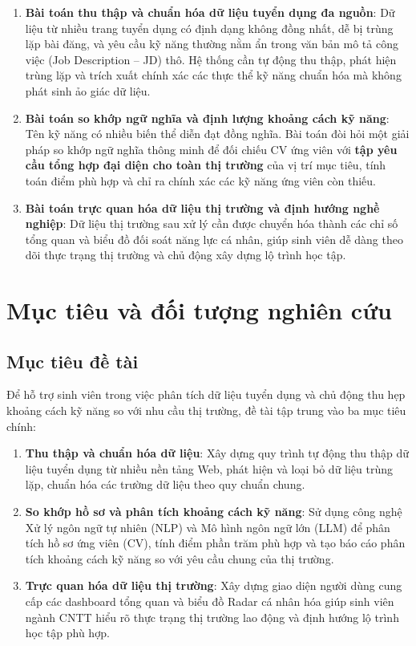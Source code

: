 \begin{enumerate}
    \item \textbf{Bài toán thu thập và chuẩn hóa dữ liệu tuyển dụng đa nguồn}: Dữ liệu từ nhiều trang tuyển dụng có định dạng không đồng nhất, dễ bị trùng lặp bài đăng, và yêu cầu kỹ năng thường nằm ẩn trong văn bản mô tả công việc (Job Description -- JD) thô. Hệ thống cần tự động thu thập, phát hiện trùng lặp và trích xuất chính xác các thực thể kỹ năng chuẩn hóa mà không phát sinh ảo giác dữ liệu.

    \item \textbf{Bài toán so khớp ngữ nghĩa và định lượng khoảng cách kỹ năng}: Tên kỹ năng có nhiều biến thể diễn đạt đồng nghĩa. Bài toán đòi hỏi một giải pháp so khớp ngữ nghĩa thông minh để đối chiếu CV ứng viên với \textbf{tập yêu cầu tổng hợp đại diện cho toàn thị trường} của vị trí mục tiêu, tính toán điểm phù hợp và chỉ ra chính xác các kỹ năng ứng viên còn thiếu.

    \item \textbf{Bài toán trực quan hóa dữ liệu thị trường và định hướng nghề nghiệp}: Dữ liệu thị trường sau xử lý cần được chuyển hóa thành các chỉ số tổng quan và biểu đồ đối soát năng lực cá nhân, giúp sinh viên dễ dàng theo dõi thực trạng thị trường và chủ động xây dựng lộ trình học tập.
\end{enumerate}

\section{Mục tiêu và đối tượng nghiên cứu}

\subsection{Mục tiêu đề tài}

Để hỗ trợ sinh viên trong việc phân tích dữ liệu tuyển dụng và chủ động thu hẹp khoảng cách kỹ năng so với nhu cầu thị trường, đề tài tập trung vào ba mục tiêu chính:

\begin{enumerate}
    \item \textbf{Thu thập và chuẩn hóa dữ liệu}: Xây dựng quy trình tự động thu thập dữ liệu tuyển dụng từ nhiều nền tảng Web, phát hiện và loại bỏ dữ liệu trùng lặp, chuẩn hóa các trường dữ liệu theo quy chuẩn chung.

    \item \textbf{So khớp hồ sơ và phân tích khoảng cách kỹ năng}: Sử dụng công nghệ Xử lý ngôn ngữ tự nhiên (NLP) và Mô hình ngôn ngữ lớn (LLM) để phân tích hồ sơ ứng viên (CV), tính điểm phần trăm phù hợp và tạo báo cáo phân tích khoảng cách kỹ năng so với yêu cầu chung của thị trường.

    \item \textbf{Trực quan hóa dữ liệu thị trường}: Xây dựng giao diện người dùng cung cấp các dashboard tổng quan và biểu đồ Radar cá nhân hóa giúp sinh viên ngành CNTT hiểu rõ thực trạng thị trường lao động và định hướng lộ trình học tập phù hợp.
\end{enumerate}

